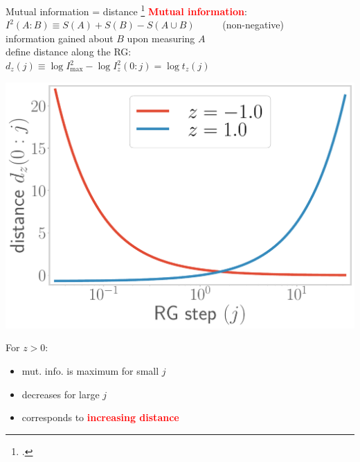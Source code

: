 \documentclass[11pt,aspectratio=169]{beamer}
\newcommand{\focus}[1]{\textcolor{red}{\bf{#1}}}
\begin{document}
\begin{frame}{Mutual information = distance}
\footcite{van2010building,lee2016,anirban_mott_2022}
	\focus{Mutual information}: ~ \(I^2(A:B) \equiv S(A) + S(B) - S(A \cup B)\) ~ ~ ~ (non-negative)\\[10pt]
	information gained about \(B\) upon measuring \(A\)\\[10pt]
	define distance along the RG: ~ ~ \(d_z(j) \equiv \log I^2_\text{max} - \log I_z^2(0:j) = \log t_z(j)\)

	\vspace*{\fill}

	\begin{minipage}{0.4\textwidth}
	\includegraphics[width=\textwidth]{figures/distance1.pdf}
	\end{minipage}
	\hspace*{\fill}
	\begin{minipage}{0.55\textwidth}
		\centering
		For \(z > 0\):\\[5pt]
		\begin{itemize}
			\item mut. info. is maximum for small \(j\)\\[10pt]
			\item decreases for large \(j\)\\[10pt]
			\item corresponds to \focus{increasing distance}
		\end{itemize}
	\end{minipage}
\end{frame}
\end{document}
